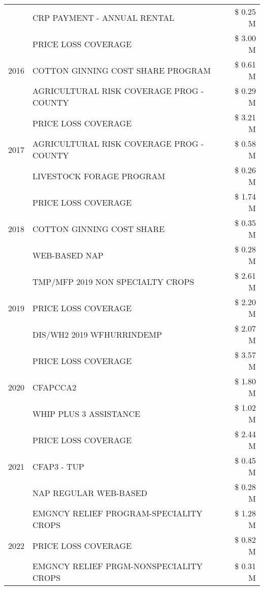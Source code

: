 \begin{tabular}{llr}
 & CRP PAYMENT - ANNUAL RENTAL & \$ 0.25 M \\
\cline{1-3}
\multirow[t]{3}{*}{2016} & PRICE LOSS COVERAGE & \$ 3.00 M \\
 & COTTON GINNING COST SHARE PROGRAM & \$ 0.61 M \\
 & AGRICULTURAL RISK COVERAGE PROG - COUNTY & \$ 0.29 M \\
\cline{1-3}
\multirow[t]{3}{*}{2017} & PRICE LOSS COVERAGE & \$ 3.21 M \\
 & AGRICULTURAL RISK COVERAGE PROG - COUNTY & \$ 0.58 M \\
 & LIVESTOCK FORAGE PROGRAM & \$ 0.26 M \\
\cline{1-3}
\multirow[t]{3}{*}{2018} & PRICE LOSS COVERAGE & \$ 1.74 M \\
 & COTTON GINNING COST SHARE & \$ 0.35 M \\
 & WEB-BASED NAP & \$ 0.28 M \\
\cline{1-3}
\multirow[t]{3}{*}{2019} & TMP/MFP 2019 NON SPECIALTY CROPS & \$ 2.61 M \\
 & PRICE LOSS COVERAGE & \$ 2.20 M \\
 & DIS/WH2 2019 WFHURRINDEMP & \$ 2.07 M \\
\cline{1-3}
\multirow[t]{3}{*}{2020} & PRICE LOSS COVERAGE & \$ 3.57 M \\
 & CFAPCCA2 & \$ 1.80 M \\
 & WHIP PLUS 3 ASSISTANCE & \$ 1.02 M \\
\cline{1-3}
\multirow[t]{3}{*}{2021} & PRICE LOSS COVERAGE & \$ 2.44 M \\
 & CFAP3 - TUP & \$ 0.45 M \\
 & NAP REGULAR WEB-BASED & \$ 0.28 M \\
\cline{1-3}
\multirow[t]{3}{*}{2022} & EMGNCY RELIEF PROGRAM-SPECIALITY CROPS & \$ 1.28 M \\
 & PRICE LOSS COVERAGE & \$ 0.82 M \\
 & EMGNCY RELIEF PRGM-NONSPECIALITY CROPS & \$ 0.31 M \\
\cline{1-3}
\bottomrule
\end{tabular}
